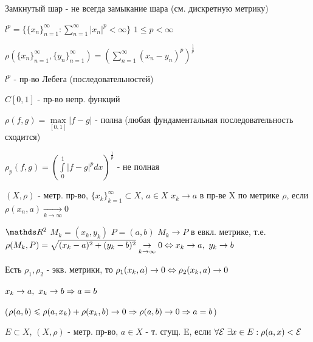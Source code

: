 \documentclass[11pt]{article}
\begin{document}
\begin{exercise}
    Замкнутый шар - не всегда замыкание шара (см. дискретную метрику)
\end{exercise}

\begin{instance}
    $l^p=\{ \{x_n\}_{n=1}^\infty: \sum\limits_{n=1}^\infty |x_n|^p < \infty \}$ $1 \leqslant p < \infty$
    
    $\rho(\{x_n\}_{n=1}^\infty, \{y_n\}_{n=1}^\infty) = (\sum\limits_{n=1}^\infty (x_n-y_n)^p)^{\frac{1}{p}}$
    
    $l^p$ - пр-во Лебега (последовательностей)
\end{instance}

\begin{instance}
    $C[0,1]$ - пр-во непр. функций
    
    $\rho(f,g)=\max\limits_{[0,1]} |f-g|$ - полна (любая фундаментальная последовательность сходится)
    
    $\rho_p(f,g)=(\int\limits_0^1 |f-g|^p dx)^{\frac{1}{p}}$ - не полная
\end{instance}

\begin{definition}
    $(X, \rho)$ - метр. пр-во, $\{x_k\}_{k=1}^\infty \subset X$, $a \in X$ $x_k \rightarrow a$ в пр-ве X по метрике $\rho$, если $\rho(x_n,a) \underset{k \rightarrow \infty}{\rightarrow} 0$
\end{definition}

\begin{instances}
    $\R^2$ $M_k=(x_k, y_k)$ $P=(a,b)$ $M_k \rightarrow P$ в евкл. метрике, т.е. $\rho(M_k,P)=\sqrt{(x_k-a)^2+(y_k-b)^2} \underset{k \rightarrow \infty}{\rightarrow} 0 \Leftrightarrow x_k \rightarrow a,\ y_k \rightarrow b$
\end{instances}

\begin{comments}
    Есть $\rho_1,\rho_2$ - экв. метрики, то $\rho_1(x_k,a) \rightarrow 0 \Leftrightarrow \rho_2(x_k,a) \rightarrow 0$
\end{comments}

\begin{exercise}
    $x_k \rightarrow a,\ x_k \rightarrow b \Rightarrow a=b$
    
    ($\rho(a,b) \leqslant \rho(a, x_k) + \rho(x_k,b) \rightarrow 0 \Rightarrow \rho (a,b) \rightarrow 0 \Rightarrow a=b$)
\end{exercise}

\begin{definition}
    $E \subset X$, $(X, \rho)$ - метр. пр-во, $a \in X$ - т. сгущ. E, если $\forall \mathcal{E} \ \exists x \in E: \rho(a,x) < \mathcal{E}$
\end{definition}
\end{document}
